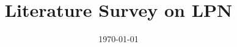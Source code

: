 \documentclass[11pt]{article}
\begin{document}
\author{}



\title{Literature Survey on LPN}

\date{\today}

\maketitle


%






\newpage

	
\newpage



\end{document}
